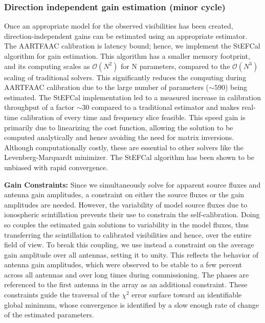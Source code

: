 \documentclass[referee]{aa}
\begin{document}
\subsubsection{\label{sub:Direction-independent-gain}Direction independent gain
estimation (minor cycle)}

Once  an appropriate  model  for  the observed  visibilities  has been  created,
direction-independent gains can be estimated using an appropriate estimator. The
AARTFAAC  calibration  is  latency   bound;  hence,  we  implement  the  StEFCal
\citep{salvini2014stef,salvini2014stefursi} algorithm for gain estimation.  This
algorithm  has  a  smaller  memory   footprint,  and  its  computing  scales  as
$\mathcal{O}(N^{2})$  for  N parameters,  compared  to the  $\mathcal{O}(N^{3})$
scaling of traditional solvers.  This significantly reduces the computing during
AARTFAAC calibration due  to the large number of  parameters ($\sim$$590$) being
estimated.  The StEFCal implementation led to a measured increase in calibration
throughput  of   a  factor   $\sim$$30$  \citep{salvini2014stef}  compared   to  a
traditional  estimator  and  makes  real-time  calibration  of  every  time  and
frequency slice feasible.   This speed gain is primarily  due to linearizing the
cost  function, allowing  the solution  to  be computed  analytically and  hence
avoiding the need for  matrix inversions. Although computationally costly, these
are  essential to  other solvers  like the  Levenberg-Marquardt  minimizer.  The
StEFCal algorithm has been shown to be unbiased with rapid convergence.

\textbf{Gain  Constraints:} Since  we simultaneously  solve for  apparent source
fluxes and antenna  gain amplitudes, a  constraint on either  the source
fluxes  or the gain  amplitudes are  needed. However,  the variability  of model
source fluxes due  to ionospheric scintillation prevents their  use to constrain
the  self-calibration.   Doing  so  couples  the  estimated  gain  solutions  to
variability  in  the  model  fluxes,  thus  transferring  the  scintillation  to
calibrated visibilities and hence, over the entire field of view.  To break this
coupling, we  use instead a  constraint on the  average gain amplitude  over all
antennas,  setting it to  unity.  This  reflects the  behavior of  antenna gain
amplitudes,  which were  observed  to be  stable  to a  few  percent across  all
antennas and over long times during commissioning.  The phases are referenced to
the first antenna  in the array as an  additional constraint.  These constraints
guide  the traversal  of the  $\chi^{2}$ error  surface toward  an identifiable
global minimum, whose convergence is identified  by a slow enough rate of change
of the estimated parameters.
\end{document}
